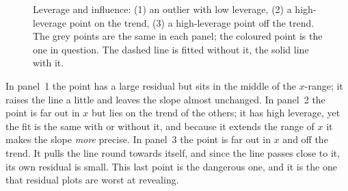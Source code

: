 \documentclass[11pt,a4paper]{article}
\numberwithin{equation}{section}
\theoremstyle{definition}
\begin{document}
\begin{figure}[H]
\centering
{}
\caption{Leverage and influence: (1) an outlier with low leverage, (2) a high-leverage
point on the trend, (3) a high-leverage point off the trend. The grey points are the same in
each panel; the coloured point is the one in question. The dashed line is fitted without it, the solid line with it.}
\label{fig:influence-types}
\end{figure}

In panel~1 the point has a large residual but sits in the middle of the $x$-range; it raises
the line a little and leaves the slope almost unchanged. In panel~2 the point is far out in
$x$ but lies on the trend of the others; it has high leverage, yet the fit is the same with
or without it, and because it extends the range of $x$ it makes the slope \emph{more}
precise. In panel~3 the point is far out in $x$ and off the trend. It pulls the line round
towards itself, and since the line passes close to it, its own residual is small. This last
point is the dangerous one, and it is the one that residual plots are worst at revealing.
\end{document}
